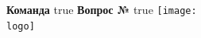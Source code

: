 \def \ifbarc {true}
\def \iflogo {true}


    \noindent
    \textbf{Команда \theteams}
    \ifx\ifbarc\useBarcode
      {\hfill {}  \hfill}
    \else \hfill
    \fi
    \textbf{Вопрос №\thequestions}
    \vfill
    \ifx\iflogo\useLogo
      {\hspace{-2mm}\texttt{[image: \\logo]}}
    \else \ 
    \fi
    \newline \newline \newline
    
